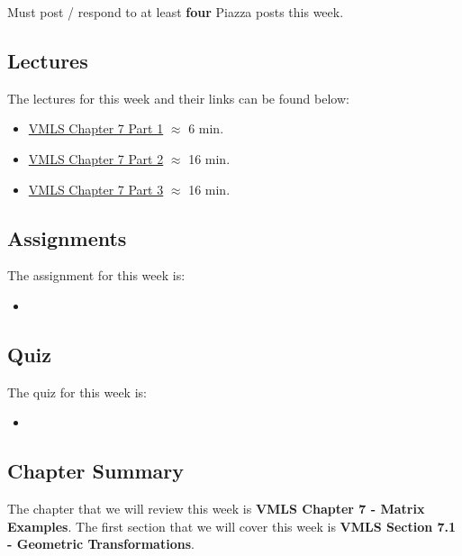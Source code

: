 Must post / respond to at least \textbf{four} Piazza posts this week.

\subsection{Lectures}

The lectures for this week and their links can be found below:

\begin{itemize}
    \item \href{https://www.youtube.com/watch?v=jXN50fuRSqE}{VMLS Chapter 7 Part 1} $\approx$ 6 min.
    \item \href{https://www.youtube.com/watch?v=v7CH2ry-vrQ}{VMLS Chapter 7 Part 2} $\approx$ 16 min.
    \item \href{https://www.youtube.com/watch?v=kTg0vKppOl8}{VMLS Chapter 7 Part 3} $\approx$ 16 min.
\end{itemize}

\subsection{Assignments}

The assignment for this week is:

\begin{itemize}
    \item {}
\end{itemize}

\subsection{Quiz}

The quiz for this week is:

\begin{itemize}
    \item {}
\end{itemize}

\subsection{Chapter Summary}

The chapter that we will review this week is \textbf{VMLS Chapter 7 - Matrix Examples}. The first section that we will cover this week is \textbf{VMLS Section 7.1 - Geometric Transformations}.

